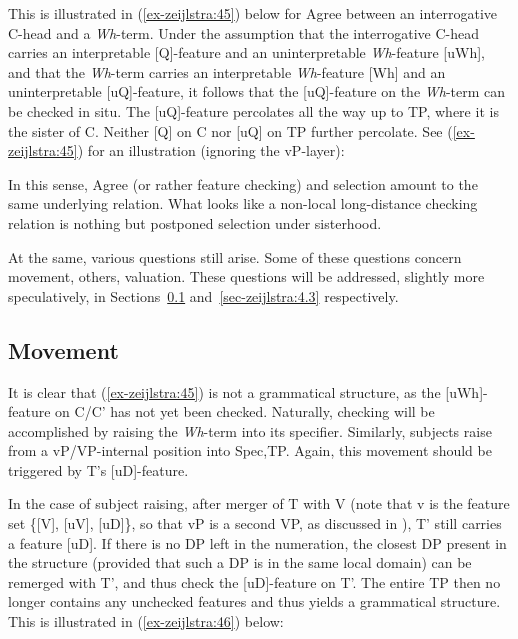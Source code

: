 \documentclass[output=paper
,modfonts
,nonflat]{langsci/langscibook}
\begin{document}
This is illustrated in (\ref{ex-zeijlstra:45}) below for Agree between an interrogative C-head and a \textit{Wh}{}-term. Under the assumption that the interrogative C-head carries an interpretable [Q]-feature and an uninterpretable \textit{Wh}-feature [uWh], and that the \textit{Wh}{}-term carries an interpretable \textit{Wh}-feature [Wh] and an uninterpretable [uQ]-feature, it follows that the [uQ]-feature on the \textit{Wh}-term can be checked in situ. The [uQ]-feature percolates all the way up to TP, where it is the sister of C. Neither [Q] on C nor [uQ] on TP further percolate. See (\ref{ex-zeijlstra:45}) for an illustration (ignoring the vP-layer):

\ea\label{ex-zeijlstra:45}
		\z
\noindent In this sense, Agree (or rather feature checking) and selection amount to the same underlying relation. What looks like a non-local long-distance checking relation is nothing but postponed selection under sisterhood.

At the same, various questions still arise. Some of these questions concern movement, others, valuation. These questions will be addressed, slightly more speculatively, in Sections~\ref{sec-zeijlstra:4.2} and~\ref{sec-zeijlstra:4.3} respectively.

\subsection{Movement} \label{sec-zeijlstra:4.2}
It is clear that (\ref{ex-zeijlstra:45}) is not a grammatical structure, as the [uWh]-feature on C/C’ has not yet been checked. Naturally, checking will be accomplished by raising the \textit{Wh}-term into its specifier. Similarly, subjects raise from a vP/VP-internal position into Spec,TP. Again, this movement should be triggered by T’s [uD]-feature. 

In the case of subject raising, after merger of T with V (note that v is the feature set \{[V], [uV], [uD]\}, so that vP is a second VP, as discussed in ), T’ still carries a feature [uD]. If there is no DP left in the numeration, the closest DP present in the structure (provided that such a DP is in the same local domain) can be remerged with T’, and thus check the [uD]-feature on T’. The entire TP then no longer contains any unchecked features and thus yields a grammatical structure. This is illustrated in (\ref{ex-zeijlstra:46}) below:
\end{document}
